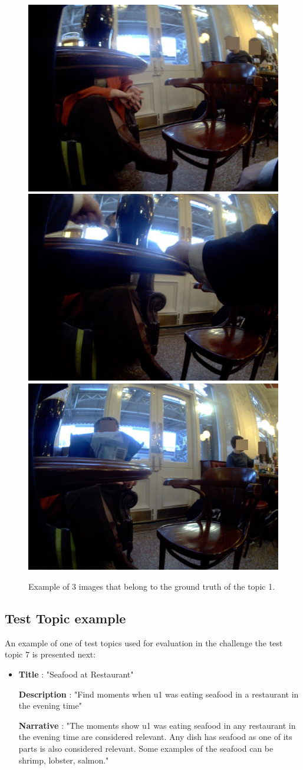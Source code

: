     \begin{figure}[H]
        \centering
        \captionsetup{justification=centering}
        \includegraphics[width=.3\linewidth]{Sections/5ImageClef/images/example.jpg}
        \includegraphics[width=.3\linewidth]{Sections/5ImageClef/images/example1.jpg}
        \includegraphics[width=.3\linewidth]{Sections/5ImageClef/images/example3.jpg}
        \caption[Ground truth images]{Example of 3 images that belong to the ground truth of the topic 1.}
        \label{fig:gt_images}
    \end{figure}      

    \newpage


    \subsection{Test Topic example}

    An example of one of test topics used for evaluation in the challenge the test topic 7 is presented next:

        \begin{itemize}

        \item []
        

        \textbf{Title} : "Seafood at Restaurant"

        \textbf{Description} : "Find moments when u1 was eating seafood in a restaurant in the evening time"

        \textbf{Narrative} : "The moments show u1 was eating seafood in any restaurant in the evening time are considered relevant. Any dish has seafood as one of its parts is also considered relevant. Some examples of the seafood can be shrimp, lobster, salmon."

        \end{itemize}
     
